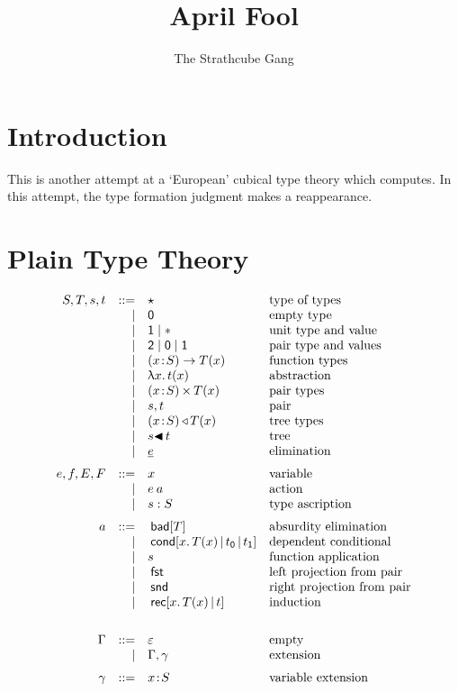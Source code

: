 \documentclass{article}
\newcommand{\hb}{\!:\!}
\newcommand{\TY}{\blue{\star}}
\newcommand{\ZERO}{\blue{\mathsf{0}}}
\newcommand{\ONE}{\blue{\mathsf{1}}}
\newcommand{\TWO}{\blue{\mathsf{2}}}
\newcommand{\PI}[2]{\blue{(}#1\hb #2\blue{)\to\;}}
\newcommand{\SG}[2]{\blue{(}#1\hb #2\blue{)\,\times\,}}
\newcommand{\WW}[2]{\blue{(}#1\hb #2\blue{)\,\triangleleft\,}}
\newcommand{\void}{\red{\ast}}
\newcommand{\ttt}{{\red{\mathsf{1}}}}
\newcommand{\fff}{{\red{\mathsf{0}}}}
\newcommand{\la}[1]{\red{\uplambda}#1.\,}
\newcommand{\pr}{\red{,}\,}
\newcommand{\tr}{\red{\blacktriangleleft}\,}
\newcommand{\el}[1]{\red{\underline{\black{#1}}}}
\newcommand{\fst}{\:\green{\mathsf{fst}}}
\newcommand{\snd}{\:\green{\mathsf{snd}}}
\newcommand{\bad}[1]{\:\green{\mathsf{bad}[}#1\green{]}}
\newcommand{\cond}[4]{\:\green{\mathsf{cond}[}#1.\,#2\green{\,\mid\,}#3\green{\,\mid\,}#4\green{]}}
\newcommand{\ind}[3]{\:\green{\mathsf{rec}[}#1.\,#2\green{\,\mid\,}#3\green{]}}
\begin{document}
\title{April Fool}
\author{The Strathcube Gang}
\maketitle

\section{Introduction}

This is another attempt at a `European' cubical type theory which computes.
In this attempt, the type formation judgment makes a reappearance.


\section{Plain Type Theory}

\[\begin{array}{rrll}
S,T,s,t & ::= & \TY   & \mbox{type of types} \\
        &   | & \ZERO & \mbox{empty type}\\
        &   | & \ONE  \;|\; \void & \mbox{unit type and value}\\
        &   | & \TWO \;|\; \fff \;|\; \ttt & \mbox{pair type and values} \\
        &   | & \PI x S T(x)   & \mbox{function types}\\
        &   | & \la x t(x)     & \mbox{abstraction}\\
        &   | & \SG x S T(x)   & \mbox{pair types}\\
        &   | & s \pr t        & \mbox{pair} \\
        &   | & \WW x S T(x)   & \mbox{tree types} \\
        &   | & s \tr t        & \mbox{tree} \\
        &   | & \el e          & \mbox{elimination}
\medskip\\
e,f,E,F & ::= & x              & \mbox{variable}\\
        &   | & e\:a           & \mbox{action}\\
        &   | & s:S            & \mbox{type ascription}
\medskip\\
a       & ::= & \bad T        & \mbox{absurdity elimination}\\
        &   | & \cond x{T(x)}{t_\fff}{t_\ttt}    & \mbox{dependent conditional}\\
        &   | & s           & \mbox{function application}\\
        &   | & \fst          & \mbox{left projection from pair}\\
        &   | & \snd          & \mbox{right projection from pair}\\
        &   | & \ind x{T(x)}t    & \mbox{induction}\\
\medskip\\
\Gamma & ::= & \varepsilon   & \mbox{empty} \\
       &   | & \Gamma,\gamma & \mbox{extension}
\medskip\\
\gamma & ::= & x\hb S & \mbox{variable extension} \\
\end{array}\]
\end{document}
